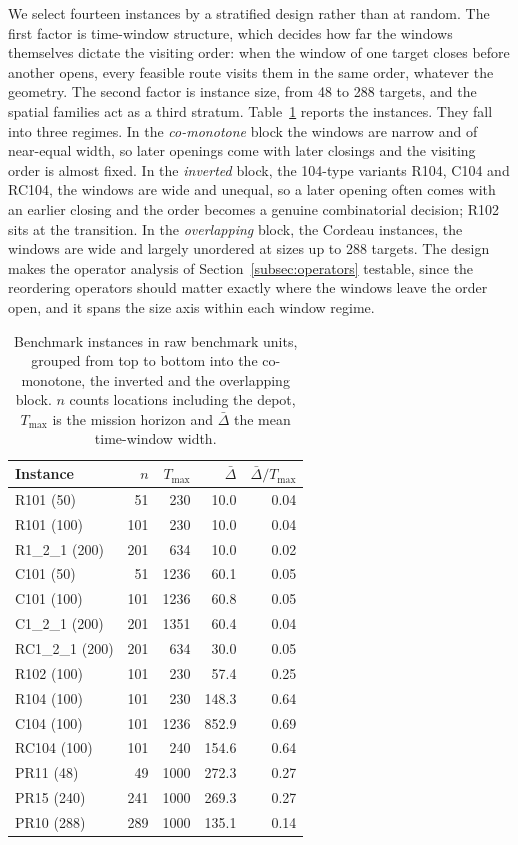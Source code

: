 \documentclass[11pt]{article}
\begin{document}
We select fourteen instances by a stratified design rather than at random. The first factor is time-window structure, which decides how far the windows themselves dictate the visiting order: when the window of one target closes before another opens, every feasible route visits them in the same order, whatever the geometry. The second factor is instance size, from 48 to 288 targets, and the spatial families act as a third stratum. Table~\ref{tab:datasets} reports the instances. They fall into three regimes. In the \emph{co-monotone} block the windows are narrow and of near-equal width, so later openings come with later closings and the visiting order is almost fixed. In the \emph{inverted} block, the 104-type variants R104, C104 and RC104, the windows are wide and unequal, so a later opening often comes with an earlier closing and the order becomes a genuine combinatorial decision; R102 sits at the transition. In the \emph{overlapping} block, the Cordeau instances, the windows are wide and largely unordered at sizes up to 288 targets. The design makes the operator analysis of Section~\ref{subsec:operators} testable, since the reordering operators should matter exactly where the windows leave the order open, and it spans the size axis within each window regime.

\begin{table}[H]
\centering
\caption{Benchmark instances in raw benchmark units, grouped from top to bottom into the co-monotone, the inverted and the overlapping block. $n$ counts locations including the depot, $T_{\max}$ is the mission horizon and $\bar{\Delta}$ the mean time-window width.}
\label{tab:datasets}
\begin{tabular}{lrrrr}
\toprule
Instance & $n$ & $T_{\max}$ & $\bar{\Delta}$ & $\bar{\Delta}/T_{\max}$ \\
\midrule
R101 (50)       &  51 &  230 &  10.0 & 0.04 \\
R101 (100)      & 101 &  230 &  10.0 & 0.04 \\
R1\_2\_1 (200)  & 201 &  634 &  10.0 & 0.02 \\
C101 (50)       &  51 & 1236 &  60.1 & 0.05 \\
C101 (100)      & 101 & 1236 &  60.8 & 0.05 \\
C1\_2\_1 (200)  & 201 & 1351 &  60.4 & 0.04 \\
RC1\_2\_1 (200) & 201 &  634 &  30.0 & 0.05 \\
\midrule
R102 (100)      & 101 &  230 &  57.4 & 0.25 \\
R104 (100)      & 101 &  230 & 148.3 & 0.64 \\
C104 (100)      & 101 & 1236 & 852.9 & 0.69 \\
RC104 (100)     & 101 &  240 & 154.6 & 0.64 \\
\midrule
PR11 (48)       &  49 & 1000 & 272.3 & 0.27 \\
PR15 (240)      & 241 & 1000 & 269.3 & 0.27 \\
PR10 (288)      & 289 & 1000 & 135.1 & 0.14 \\
\bottomrule
\end{tabular}
\end{table}
\end{document}
